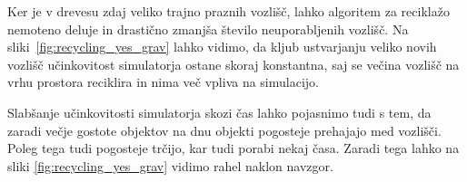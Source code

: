 \documentclass[a4paper,12pt]{article}
\begin{document}
Ker je v drevesu zdaj veliko trajno praznih vozlišč, lahko algoritem za reciklažo nemoteno deluje in drastično zmanjša število
neuporabljenih vozlišč. Na sliki~\ref{fig:recycling_yes_grav} lahko vidimo, da kljub ustvarjanju veliko novih vozlišč 
učinkovitost simulatorja ostane skoraj konstantna, saj se večina vozlišč na vrhu prostora reciklira in nima več vpliva na simulacijo.

Slabšanje učinkovitosti simulatorja skozi čas lahko pojasnimo tudi s tem, da zaradi večje gostote objektov na dnu objekti pogosteje
prehajajo med vozlišči. Poleg tega tudi pogosteje trčijo, kar tudi porabi nekaj časa. Zaradi tega lahko na sliki \ref{fig:recycling_yes_grav}
vidimo rahel naklon navzgor.
\newpage
\lstlistoflistings{}


\end{document}
